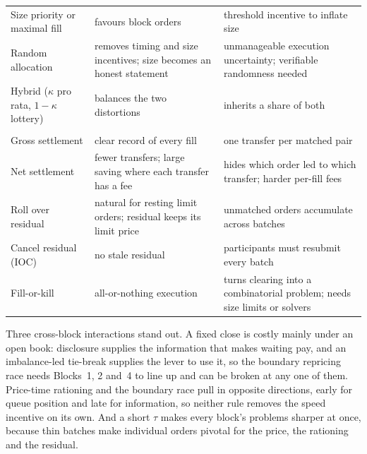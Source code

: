 \begin{longtable}{@{}>{\raggedright\arraybackslash}p{3.2cm}
  >{\raggedright\arraybackslash}p{7.2cm}
  >{\raggedright\arraybackslash}p{5.6cm}@{}}
Size priority or maximal fill &
favours block orders &
threshold incentive to inflate size\\
Random allocation &
removes timing and size incentives; size becomes an honest statement &
unmanageable execution uncertainty; verifiable randomness needed\\
Hybrid ($\kappa$ pro rata, $1-\kappa$ lottery) &
balances the two distortions &
inherits a share of both\\
\midrule
\multicolumn{3}{@{}l}{\emph{Block 5: settlement and residual (\Cref{sec:settlement})}}\\
Gross settlement &
clear record of every fill &
one transfer per matched pair\\
Net settlement &
fewer transfers; large saving where each transfer has a fee &
hides which order led to which transfer; harder per-fill fees\\
Roll over residual &
natural for resting limit orders; residual keeps its limit price &
unmatched orders accumulate across batches\\
Cancel residual (IOC) &
no stale residual &
participants must resubmit every batch\\
Fill-or-kill &
all-or-nothing execution &
turns clearing into a combinatorial problem; needs size limits or solvers\\
\end{longtable}
\endgroup

Three cross-block interactions stand out. A fixed close is costly mainly
under an open book: disclosure supplies the information that makes waiting
pay, and an imbalance-led tie-break supplies the lever to use it, so the
boundary repricing race needs Blocks~1, 2 and~4 to line up and can be
broken at any one of them. Price-time rationing and the boundary race pull
in opposite directions, early for queue position and late for
information, so neither rule removes the speed incentive on its own. And a
short $\tau$ makes every block's problems sharper at once, because thin
batches make individual orders pivotal for the price, the rationing and the
residual.
